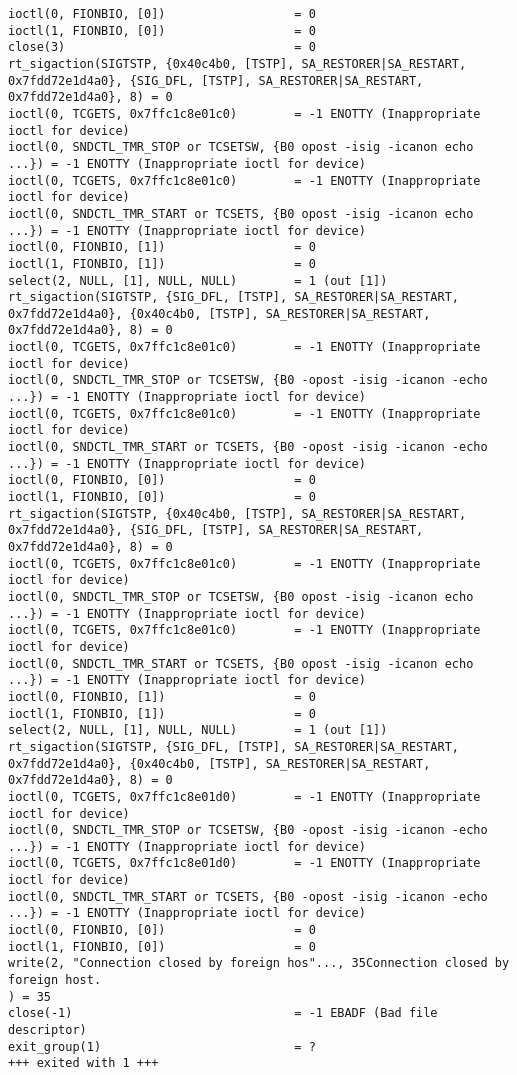 \begin{lstlisting}[caption=Telnet失敗時,label=lst:telnet-fail,linebackgroundcolor={\ifnum\value{lstnumber}>24 \ifnum\value{lstnumber}<26\color{green!30}\fi\fi}]
ioctl(0, FIONBIO, [0])                  = 0
ioctl(1, FIONBIO, [0])                  = 0
close(3)                                = 0
rt_sigaction(SIGTSTP, {0x40c4b0, [TSTP], SA_RESTORER|SA_RESTART, 0x7fdd72e1d4a0}, {SIG_DFL, [TSTP], SA_RESTORER|SA_RESTART, 0x7fdd72e1d4a0}, 8) = 0
ioctl(0, TCGETS, 0x7ffc1c8e01c0)        = -1 ENOTTY (Inappropriate ioctl for device)
ioctl(0, SNDCTL_TMR_STOP or TCSETSW, {B0 opost -isig -icanon echo ...}) = -1 ENOTTY (Inappropriate ioctl for device)
ioctl(0, TCGETS, 0x7ffc1c8e01c0)        = -1 ENOTTY (Inappropriate ioctl for device)
ioctl(0, SNDCTL_TMR_START or TCSETS, {B0 opost -isig -icanon echo ...}) = -1 ENOTTY (Inappropriate ioctl for device)
ioctl(0, FIONBIO, [1])                  = 0
ioctl(1, FIONBIO, [1])                  = 0
select(2, NULL, [1], NULL, NULL)        = 1 (out [1])
rt_sigaction(SIGTSTP, {SIG_DFL, [TSTP], SA_RESTORER|SA_RESTART, 0x7fdd72e1d4a0}, {0x40c4b0, [TSTP], SA_RESTORER|SA_RESTART, 0x7fdd72e1d4a0}, 8) = 0
ioctl(0, TCGETS, 0x7ffc1c8e01c0)        = -1 ENOTTY (Inappropriate ioctl for device)
ioctl(0, SNDCTL_TMR_STOP or TCSETSW, {B0 -opost -isig -icanon -echo ...}) = -1 ENOTTY (Inappropriate ioctl for device)
ioctl(0, TCGETS, 0x7ffc1c8e01c0)        = -1 ENOTTY (Inappropriate ioctl for device)
ioctl(0, SNDCTL_TMR_START or TCSETS, {B0 -opost -isig -icanon -echo ...}) = -1 ENOTTY (Inappropriate ioctl for device)
ioctl(0, FIONBIO, [0])                  = 0
ioctl(1, FIONBIO, [0])                  = 0
rt_sigaction(SIGTSTP, {0x40c4b0, [TSTP], SA_RESTORER|SA_RESTART, 0x7fdd72e1d4a0}, {SIG_DFL, [TSTP], SA_RESTORER|SA_RESTART, 0x7fdd72e1d4a0}, 8) = 0
ioctl(0, TCGETS, 0x7ffc1c8e01c0)        = -1 ENOTTY (Inappropriate ioctl for device)
ioctl(0, SNDCTL_TMR_STOP or TCSETSW, {B0 opost -isig -icanon echo ...}) = -1 ENOTTY (Inappropriate ioctl for device)
ioctl(0, TCGETS, 0x7ffc1c8e01c0)        = -1 ENOTTY (Inappropriate ioctl for device)
ioctl(0, SNDCTL_TMR_START or TCSETS, {B0 opost -isig -icanon echo ...}) = -1 ENOTTY (Inappropriate ioctl for device)
ioctl(0, FIONBIO, [1])                  = 0
ioctl(1, FIONBIO, [1])                  = 0
select(2, NULL, [1], NULL, NULL)        = 1 (out [1])
rt_sigaction(SIGTSTP, {SIG_DFL, [TSTP], SA_RESTORER|SA_RESTART, 0x7fdd72e1d4a0}, {0x40c4b0, [TSTP], SA_RESTORER|SA_RESTART, 0x7fdd72e1d4a0}, 8) = 0
ioctl(0, TCGETS, 0x7ffc1c8e01d0)        = -1 ENOTTY (Inappropriate ioctl for device)
ioctl(0, SNDCTL_TMR_STOP or TCSETSW, {B0 -opost -isig -icanon -echo ...}) = -1 ENOTTY (Inappropriate ioctl for device)
ioctl(0, TCGETS, 0x7ffc1c8e01d0)        = -1 ENOTTY (Inappropriate ioctl for device)
ioctl(0, SNDCTL_TMR_START or TCSETS, {B0 -opost -isig -icanon -echo ...}) = -1 ENOTTY (Inappropriate ioctl for device)
ioctl(0, FIONBIO, [0])                  = 0
ioctl(1, FIONBIO, [0])                  = 0
write(2, "Connection closed by foreign hos"..., 35Connection closed by foreign host.
) = 35
close(-1)                               = -1 EBADF (Bad file descriptor)
exit_group(1)                           = ?
+++ exited with 1 +++
\end{lstlisting}

